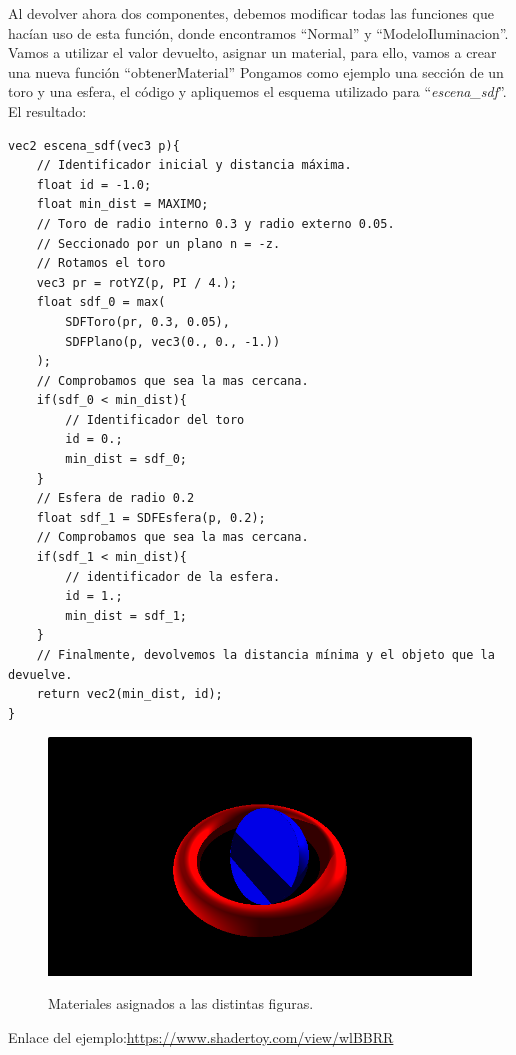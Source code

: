 Al devolver ahora dos componentes, debemos modificar todas las funciones que hacían uso de esta función, donde encontramos \enquote{Normal} y \enquote{ModeloIluminacion}. Vamos a utilizar el valor devuelto, asignar un material, para ello, vamos a crear una nueva función \enquote{obtenerMaterial} Pongamos como ejemplo una sección de un toro y una esfera, el código y apliquemos el esquema utilizado para \enquote{\textit{escena\_sdf}}. El resultado:

\begin{lstlisting}
vec2 escena_sdf(vec3 p){
    // Identificador inicial y distancia máxima.
    float id = -1.0;
    float min_dist = MAXIMO;
    // Toro de radio interno 0.3 y radio externo 0.05.
    // Seccionado por un plano n = -z.
    // Rotamos el toro 
    vec3 pr = rotYZ(p, PI / 4.);
    float sdf_0 = max(
        SDFToro(pr, 0.3, 0.05),
        SDFPlano(p, vec3(0., 0., -1.))
    );
    // Comprobamos que sea la mas cercana.
    if(sdf_0 < min_dist){
        // Identificador del toro
        id = 0.;
        min_dist = sdf_0;
    }
    // Esfera de radio 0.2
    float sdf_1 = SDFEsfera(p, 0.2);
    // Comprobamos que sea la mas cercana.
    if(sdf_1 < min_dist){
        // identificador de la esfera.
        id = 1.;
        min_dist = sdf_1;
    }
    // Finalmente, devolvemos la distancia mínima y el objeto que la devuelve.
    return vec2(min_dist, id);
}
\end{lstlisting}


\begin{figure}[H]
  \centering
  \captionsetup{justification=centering}%
  \includegraphics[width=1.0\textwidth]{secciones/imagenes/material/materiales.png}\label{fig:material}
  \caption{Materiales asignados a las distintas figuras.}
\end{figure}

Enlace del ejemplo:\url{https://www.shadertoy.com/view/wlBBRR}